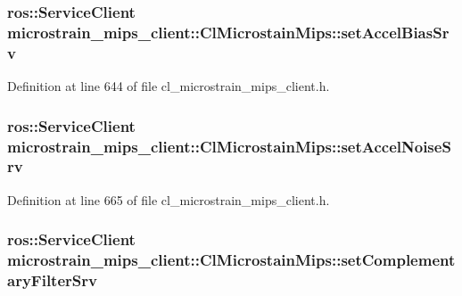 \subsubsection[{\texorpdfstring{set\+Accel\+Bias\+Srv}{setAccelBiasSrv}}]{\setlength{\rightskip}{0pt plus 5cm}ros\+::\+Service\+Client microstrain\+\_\+mips\+\_\+client\+::\+Cl\+Microstain\+Mips\+::set\+Accel\+Bias\+Srv\hspace{0.3cm}{\ttfamily [protected]}}\hypertarget{classmicrostrain__mips__client_1_1ClMicrostainMips_a95389f5732d4d8c26422c74b169b4c96}{}\label{classmicrostrain__mips__client_1_1ClMicrostainMips_a95389f5732d4d8c26422c74b169b4c96}


Definition at line 644 of file cl\+\_\+microstrain\+\_\+mips\+\_\+client.\+h.

\subsubsection[{\texorpdfstring{set\+Accel\+Noise\+Srv}{setAccelNoiseSrv}}]{\setlength{\rightskip}{0pt plus 5cm}ros\+::\+Service\+Client microstrain\+\_\+mips\+\_\+client\+::\+Cl\+Microstain\+Mips\+::set\+Accel\+Noise\+Srv\hspace{0.3cm}{\ttfamily [protected]}}\hypertarget{classmicrostrain__mips__client_1_1ClMicrostainMips_a9131cf72e9303a83abce526c3780b5df}{}\label{classmicrostrain__mips__client_1_1ClMicrostainMips_a9131cf72e9303a83abce526c3780b5df}


Definition at line 665 of file cl\+\_\+microstrain\+\_\+mips\+\_\+client.\+h.

\subsubsection[{\texorpdfstring{set\+Complementary\+Filter\+Srv}{setComplementaryFilterSrv}}]{\setlength{\rightskip}{0pt plus 5cm}ros\+::\+Service\+Client microstrain\+\_\+mips\+\_\+client\+::\+Cl\+Microstain\+Mips\+::set\+Complementary\+Filter\+Srv\hspace{0.3cm}{\ttfamily [protected]}}\hypertarget{classmicrostrain__mips__client_1_1ClMicrostainMips_a42e0fbe9912d59fe6dcd544945c34ad9}{}\label{classmicrostrain__mips__client_1_1ClMicrostainMips_a42e0fbe9912d59fe6dcd544945c34ad9}


